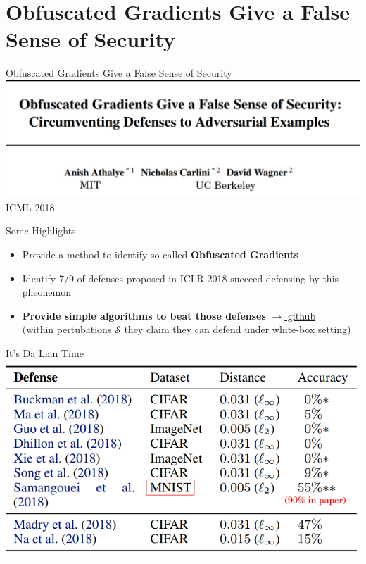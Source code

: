\documentclass{beamer}
\begin{document}
\section{Obfuscated Gradients Give a False Sense of Security}
\begin{frame}{Obfuscated Gradients Give a False Sense of Security}
  \includegraphics[width=\textwidth]{fig/ob-grad/ob-grad-title.png}
  \center ICML 2018
\end{frame}

\begin{frame}{Some Highlights}
  \begin{itemize}
    \item Provide a method to identify so-called \textbf{Obfuscated Gradients}
    \item Identify 7/9 of defenses proposed in ICLR 2018 succeed defensing by this pheonemon
    \item \textbf{Provide simple algorithms to beat those defenses} \href{https://github.com/anishathalye/obfuscated-gradients}{$\rightarrow$ github}\\
      (within pertubations $\mathcal{S}$ they claim they can defend under white-box setting)
  \end{itemize}
\end{frame}

\begin{frame}{It's Da Lian Time}
  \includegraphics[width=\textwidth]{fig/ob-grad/table.png}
\end{frame}
\end{document}
